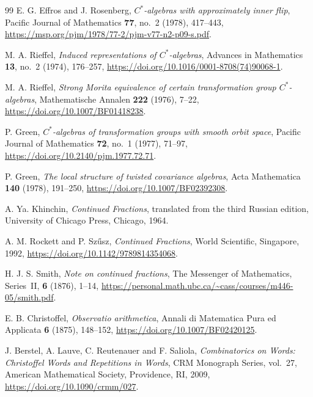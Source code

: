 \documentclass{book}
\begin{document}
\begin{thebibliography}{99}
  E. G. Effros and J. Rosenberg,
  \textit{\(C^*\)-algebras with approximately inner flip},
  Pacific Journal of Mathematics
  \textbf{77}, no.~2 (1978), 417--443,
  \url{https://msp.org/pjm/1978/77-2/pjm-v77-n2-p09-s.pdf}.

  M. A. Rieffel,
  \textit{Induced representations of \(C^*\)-algebras},
  Advances in Mathematics
  \textbf{13}, no.~2 (1974), 176--257,
  \url{https://doi.org/10.1016/0001-8708(74)90068-1}.

  M. A. Rieffel,
  \textit{Strong Morita equivalence of certain transformation group
  \(C^*\)-algebras},
  Mathematische Annalen
  \textbf{222} (1976), 7--22,
  \url{https://doi.org/10.1007/BF01418238}.

  P. Green,
  \textit{\(C^*\)-algebras of transformation groups with smooth orbit space},
  Pacific Journal of Mathematics
  \textbf{72}, no.~1 (1977), 71--97,
  \url{https://doi.org/10.2140/pjm.1977.72.71}.  

  P. Green,
  \textit{The local structure of twisted covariance algebras},
  Acta Mathematica
  \textbf{140} (1978), 191--250,
  \url{https://doi.org/10.1007/BF02392308}.

  A. Ya. Khinchin,
  \textit{Continued Fractions},
  translated from the third Russian edition,
  University of Chicago Press,
  Chicago,
  1964.

  A. M. Rockett and P. Sz\H{u}sz,
  \textit{Continued Fractions},
  World Scientific,
  Singapore,
  1992,
  \url{https://doi.org/10.1142/9789814354068}.

  H. J. S. Smith,
  \textit{Note on continued fractions},
  The Messenger of Mathematics, Series~II,
  \textbf{6} (1876), 1--14,
  \url{https://personal.math.ubc.ca/~cass/courses/m446-05/smith.pdf}.

  E. B. Christoffel,
  \textit{Observatio arithmetica},
  Annali di Matematica Pura ed Applicata
  \textbf{6} (1875), 148--152,
  \url{https://doi.org/10.1007/BF02420125}.

  J. Berstel, A. Lauve, C. Reutenauer and F. Saliola,
  \textit{Combinatorics on Words: Christoffel Words and Repetitions in Words},
  CRM Monograph Series, vol.~27,
  American Mathematical Society,
  Providence, RI,
  2009,
  \url{https://doi.org/10.1090/crmm/027}.


\end{thebibliography}
\end{document}
